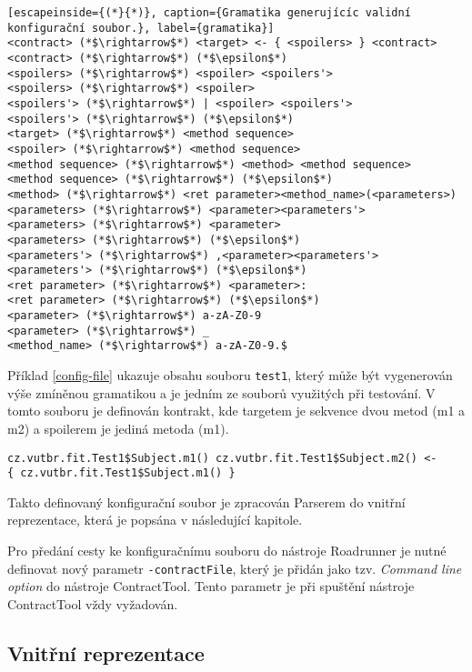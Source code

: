 \begin{lstlisting}[escapeinside={(*}{*)}, caption={Gramatika generujícíc validní konfigurační soubor.}, label={gramatika}]
<contract> (*$\rightarrow$*) <target> <- { <spoilers> } <contract>
<contract> (*$\rightarrow$*) (*$\epsilon$*)
<spoilers> (*$\rightarrow$*) <spoiler> <spoilers'>
<spoilers> (*$\rightarrow$*) <spoiler>
<spoilers'> (*$\rightarrow$*) | <spoiler> <spoilers'>
<spoilers'> (*$\rightarrow$*) (*$\epsilon$*)
<target> (*$\rightarrow$*) <method sequence>
<spoiler> (*$\rightarrow$*) <method sequence>
<method sequence> (*$\rightarrow$*) <method> <method sequence>
<method sequence> (*$\rightarrow$*) (*$\epsilon$*)
<method> (*$\rightarrow$*) <ret parameter><method_name>(<parameters>)
<parameters> (*$\rightarrow$*) <parameter><parameters'>
<parameters> (*$\rightarrow$*) <parameter>
<parameters> (*$\rightarrow$*) (*$\epsilon$*)
<parameters'> (*$\rightarrow$*) ,<parameter><parameters'>
<parameters'> (*$\rightarrow$*) (*$\epsilon$*)
<ret parameter> (*$\rightarrow$*) <parameter>:
<ret parameter> (*$\rightarrow$*) (*$\epsilon$*)
<parameter> (*$\rightarrow$*) a-zA-Z0-9
<parameter> (*$\rightarrow$*) _
<method_name> (*$\rightarrow$*) a-zA-Z0-9.$
\end{lstlisting}

Příklad \ref{config-file} ukazuje obsahu souboru \texttt{test1}, který může být vygenerován výše zmíněnou gramatikou a je jedním ze souborů využitých při testování. V tomto souboru je definován kontrakt, kde targetem je sekvence dvou metod (m1 a m2) a spoilerem je jediná metoda (m1).

\begin{lstlisting}[caption={Příklad konfiguračního souboru.},label={config-file}]
cz.vutbr.fit.Test1$Subject.m1() cz.vutbr.fit.Test1$Subject.m2() <-
{ cz.vutbr.fit.Test1$Subject.m1() }
\end{lstlisting}

Takto definovaný konfigurační soubor je zpracován Parserem do vnitřní reprezentace, která je popsána v následující kapitole.

Pro předání cesty ke konfiguračnímu souboru do nástroje Roadrunner je nutné definovat nový parametr \texttt{-contractFile}, který je přidán jako tzv. \textit{Command line option} do nástroje ContractTool. Tento parametr je při spuštění nástroje ContractTool vždy vyžadován.

\subsection{Vnitřní reprezentace}\label{vnitrni-rep}

